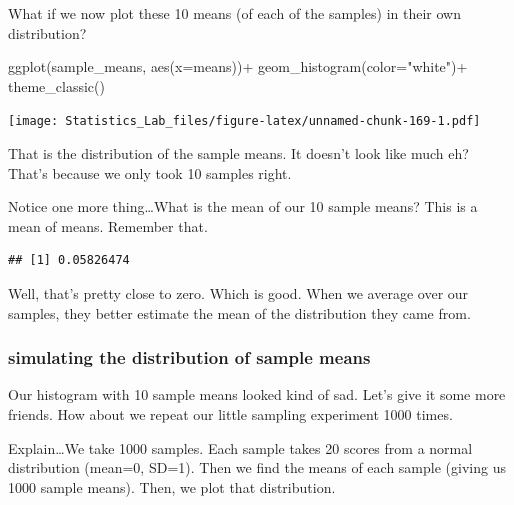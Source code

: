 \documentclass[
]{book}
\newenvironment{Shaded}{\begin{snugshade}}{\end{snugshade}}
\newcommand{\AttributeTok}[1]{\textcolor[rgb]{0.77,0.63,0.00}{#1}}
\newcommand{\FunctionTok}[1]{\textcolor[rgb]{0.00,0.00,0.00}{#1}}
\newcommand{\NormalTok}[1]{#1}
\newcommand{\SpecialCharTok}[1]{\textcolor[rgb]{0.00,0.00,0.00}{#1}}
\newcommand{\StringTok}[1]{\textcolor[rgb]{0.31,0.60,0.02}{#1}}
\begin{document}
What if we now plot these 10 means (of each of the samples) in their own distribution?

\begin{Shaded}
\begin{Highlighting}[]
 \FunctionTok{ggplot}\NormalTok{(sample\_means, }\FunctionTok{aes}\NormalTok{(}\AttributeTok{x=}\NormalTok{means))}\SpecialCharTok{+}
  \FunctionTok{geom\_histogram}\NormalTok{(}\AttributeTok{color=}\StringTok{"white"}\NormalTok{)}\SpecialCharTok{+}
  \FunctionTok{theme\_classic}\NormalTok{()}
\end{Highlighting}
\end{Shaded}

\texttt{[image: Statistics\_Lab\_files/figure-latex/unnamed-chunk-169-1.pdf]}

That is the distribution of the sample means. It doesn't look like much eh? That's because we only took 10 samples right.

Notice one more thing\ldots What is the mean of our 10 sample means? This is a mean of means. Remember that.

\begin{Shaded}
\end{Shaded}

\begin{verbatim}
## [1] 0.05826474
\end{verbatim}

Well, that's pretty close to zero. Which is good. When we average over our samples, they better estimate the mean of the distribution they came from.

\hypertarget{simulating-the-distribution-of-sample-means}{%
\subsubsection{simulating the distribution of sample means}\label{simulating-the-distribution-of-sample-means}}

Our histogram with 10 sample means looked kind of sad. Let's give it some more friends. How about we repeat our little sampling experiment 1000 times.

Explain\ldots We take 1000 samples. Each sample takes 20 scores from a normal distribution (mean=0, SD=1). Then we find the means of each sample (giving us 1000 sample means). Then, we plot that distribution.
\end{document}

